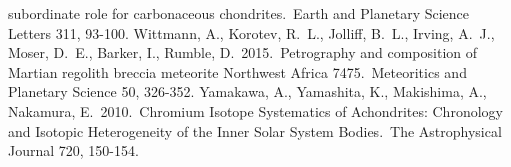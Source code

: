 \documentclass[preprint,5p,times,authoryear]{elsarticle}
\begin{document}
\begin{thebibliography}{}
subordinate role for carbonaceous chondrites.\ Earth and Planetary Science Letters 311, 93-100.
 Wittmann, A., Korotev, R.~L., Jolliff, B.~L., Irving, A.~J., Moser, D.~E., Barker, 
I., Rumble, D.\ 2015.\ Petrography and composition of Martian regolith breccia meteorite Northwest Africa 7475.\ Meteoritics and 
Planetary Science 50, 326-352.
 Yamakawa, A., Yamashita, K., Makishima, A., Nakamura, E.\ 2010.\ Chromium Isotope 
Systematics of Achondrites: Chronology and Isotopic Heterogeneity of the Inner Solar System Bodies.\ The Astrophysical Journal 720, 
150-154.
\end{thebibliography}
\end{document}

